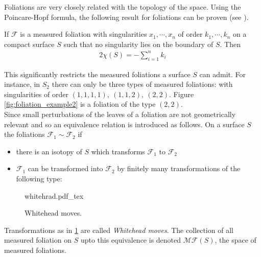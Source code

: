 Foliations are very closely related with the topology of the space. Using the Poincare-Hopf formula, the following result for foliations can be proven (see \cite{FLP}).
\begin{theorem}
  If $ \mathscr{F}$ is a measured foliation with singularities $x_1,\cdots, x_n$ of order $k_1,\cdots, k_n$ on a compact surface $S$ such that no singularity lies on the boundary of $S$. Then
  \begin{align}
    2\chi(S) = -\sum_{i=1}^n k_i
  \end{align}
\end{theorem}
This significantly restricts the measured foliations a surface $S$ can admit. For instance, in $S_2$ there can only be three types of measured foliations: with singularities of order $(1,1,1,1),\ (1,1,2),\ (2,2)$. Figure \ref{fig:foliation_example2} is a foliation of the type $(2,2)$.\\

Since small perturbations of the leaves of a foliation are not geometrically relevant and so an equivalence relation is introduced as follows. On a surface $S$ the foliations $ \mathscr{F}_1 \sim \mathscr{F}_2$ if
\begin{itemize}
  \item there is an isotopy of $S$ which transforms $ \mathscr{F}_1$ to $ \mathscr{F}_2$
  \item $ \mathscr{F}_1$ can be transformed into $ \mathscr{F}_2$ by finitely many transformations of the following type:
\end{itemize}
\begin{figure}[h]
  \centering
  \def\svgwidth{0.5\textwidth}
  {whitehrad.pdf_tex}
  \caption{Whitehead moves.}
  \label{fig:whitehead}
\end{figure}
Transformations as in \ref{fig:whitehead} are called \textit{Whitehead moves}. The collection of all measured foliation on $S$ upto this equivalence is denoted $ \mathcal{MF}(S)$, the space of measured foliations.\\

